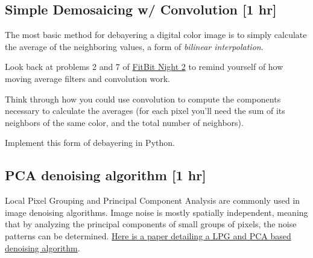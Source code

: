 \documentclass{tufte-handout}
\begin{document}

\subsection{Simple Demosaicing w/ Convolution [1 hr]}


The most basic method for debayering a digital color image is to simply calculate the average of the neighboring values, a form of \emph{bilinear interpolation}.

\bex
\item Look back at problems 2 and 7 of \href{https://drive.google.com/file/d/1_eEtwNDHhF-Izfcf6l00PvG-b6whwety/view}{FitBit Night 2} to remind yourself of how moving average filters and convolution work.
\item Think through how you could use convolution to compute the components necessary to calculate the averages (for each pixel you'll need the sum of its neighbors of the same color, and the total number of neighbors).
\item Implement this form of debayering in Python.
\eex




\subsection{PCA denoising algorithm [1 hr]}  %

Local Pixel Grouping and Principal Component Analysis are commonly used in image denoising algorithms. Image noise is mostly spatially independent, meaning that by analyzing the principal components of small groups of pixels, the noise patterns can be determined. \href{https://www4.comp.polyu.edu.hk/~cslzhang/paper/PR_10_x_3.pdf}{Here is a paper detailing a LPG and PCA based denoising algorithm}.
\end{document}
